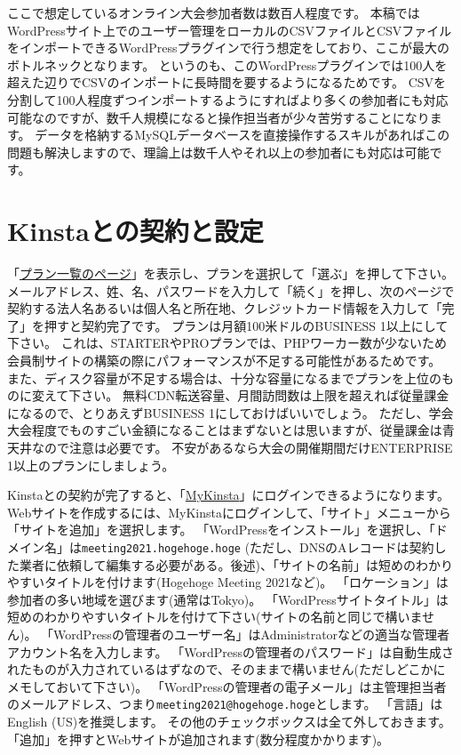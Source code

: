 \documentclass[titlepage,10pt,a4paper,uplatex]{jsbook}
\begin{document}
ここで想定しているオンライン大会参加者数は数百人程度です。
本稿ではWordPressサイト上でのユーザー管理をローカルのCSVファイルとCSVファイルをインポートできるWordPressプラグインで行う想定をしており、ここが最大のボトルネックとなります。
というのも、このWordPressプラグインでは100人を超えた辺りでCSVのインポートに長時間を要するようになるためです。
CSVを分割して100人程度ずつインポートするようにすればより多くの参加者にも対応可能なのですが、数千人規模になると操作担当者が少々苦労することになります。
データを格納するMySQLデータベースを直接操作するスキルがあればこの問題も解決しますので、理論上は数千人やそれ以上の参加者にも対応は可能です。

\section{Kinstaとの契約と設定}

「\href{https://kinsta.com/jp/plans/}{プラン一覧のページ}」を表示し、プランを選択して「選ぶ」を押して下さい。
メールアドレス、姓、名、パスワードを入力して「続く」を押し、次のページで契約する法人名あるいは個人名と所在地、クレジットカード情報を入力して「完了」を押すと契約完了です。
プランは月額100米ドルのBUSINESS 1以上にして下さい。
これは、STARTERやPROプランでは、PHPワーカー数が少ないため会員制サイトの構築の際にパフォーマンスが不足する可能性があるためです。
また、ディスク容量が不足する場合は、十分な容量になるまでプランを上位のものに変えて下さい。
無料CDN転送容量、月間訪問数は上限を超えれば従量課金になるので、とりあえずBUSINESS 1にしておけばいいでしょう。
ただし、学会大会程度でものすごい金額になることはまずないとは思いますが、従量課金は青天井なので注意は必要です。
不安があるなら大会の開催期間だけENTERPRISE 1以上のプランにしましょう。

Kinstaとの契約が完了すると、「\href{https://my.kinsta.com/login/?lang=jp}{MyKinsta}」にログインできるようになります。
Webサイトを作成するには、MyKinstaにログインして、「サイト」メニューから「サイトを追加」を選択します。
「WordPressをインストール」を選択し、「ドメイン名」は\texttt{meeting2021.hogehoge.hoge} (ただし、DNSのAレコードは契約した業者に依頼して編集する必要がある。後述)、「サイトの名前」は短めのわかりやすいタイトルを付けます(Hogehoge Meeting 2021など)。
「ロケーション」は参加者の多い地域を選びます(通常はTokyo)。
「WordPressサイトタイトル」は短めのわかりやすいタイトルを付けて下さい(サイトの名前と同じで構いません)。
「WordPressの管理者のユーザー名」はAdministratorなどの適当な管理者アカウント名を入力します。
「WordPressの管理者のパスワード」は自動生成されたものが入力されているはずなので、そのままで構いません(ただしどこかにメモしておいて下さい)。
「WordPressの管理者の電子メール」は主管理担当者のメールアドレス、つまり\texttt{meeting2021@hogehoge.hoge}とします。
「言語」はEnglish (US)を推奨します。
その他のチェックボックスは全て外しておきます。
「追加」を押すとWebサイトが追加されます(数分程度かかります)。
\end{document}

